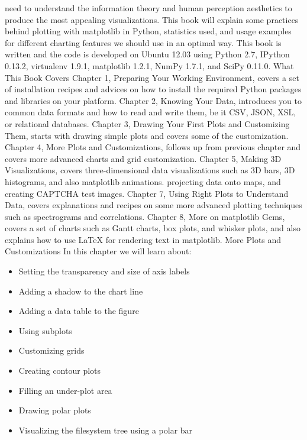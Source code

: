 need to understand the information theory and human perception aesthetics to produce
the most appealing visualizations.
This book will explain some practices behind plotting with matplotlib in Python, statistics
used, and usage examples for different charting features we should use in an optimal way.
This book is written and the code is developed on Ubuntu 12.03 using Python 2.7,
IPython 0.13.2, virtualenv 1.9.1, matplotlib 1.2.1, NumPy 1.7.1, and SciPy 0.11.0.
What This Book Covers
Chapter 1, Preparing Your Working Environment, covers a set of installation recipes
and advices on how to install the required Python packages and libraries on
your platform.
Chapter 2, Knowing Your Data, introduces you to common data formats and how
to read and write them, be it CSV, JSON, XSL, or relational databases.
Chapter 3, Drawing Your First Plots and Customizing Them, starts with drawing
simple plots and covers some of the customization.
Chapter 4, More Plots and Customizations, follows up from previous chapter and
covers more advanced charts and grid customization.
Chapter 5, Making 3D Visualizations, covers three-dimensional data visualizations
such as 3D bars, 3D histograms, and also matplotlib animations.
\newpage %
projecting data onto maps, and creating CAPTCHA test images.
Chapter 7, Using Right Plots to Understand Data, covers explanations and recipes
on some more advanced plotting techniques such as spectrograms and correlations.
Chapter 8, More on matplotlib Gems, covers a set of charts such as Gantt charts,
box plots, and whisker plots, and also explains how to use LaTeX for rendering
text in matplotlib.
\newpage %
More Plots and Customizations
In this chapter we will learn about:
\begin{itemize}
\item Setting the transparency and size of axis labels
\item Adding a shadow to the chart line
\item Adding a data table to the figure
\item Using subplots
\item Customizing grids
\item Creating contour plots
\item Filling an under-plot area
\item Drawing polar plots
\item Visualizing the filesystem tree using a polar bar
\end{itemize}

